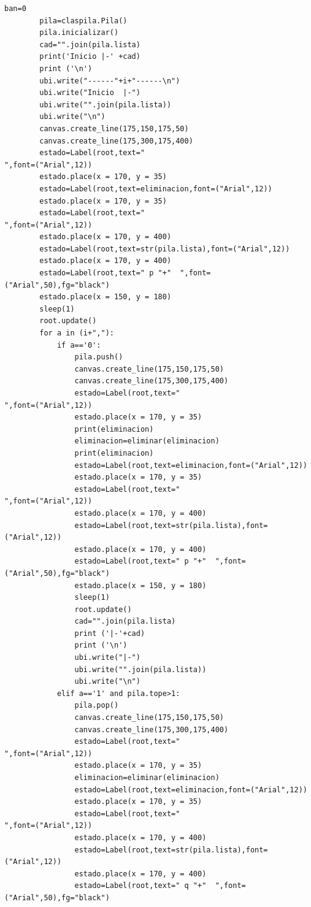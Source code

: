 \documentclass[12pt]{article}
\begin{document}
\begin{lstlisting}[frame=single]
		ban=0
		pila=claspila.Pila()
		pila.inicializar()
		cad="".join(pila.lista)
		print('Inicio |-' +cad) 
		print ('\n')
		ubi.write("------"+i+"------\n")
		ubi.write("Inicio  |-")
		ubi.write("".join(pila.lista))
		ubi.write("\n")
		canvas.create_line(175,150,175,50)
		canvas.create_line(175,300,175,400)
		estado=Label(root,text="                                                                      ",font=("Arial",12))
		estado.place(x = 170, y = 35)
		estado=Label(root,text=eliminacion,font=("Arial",12))
		estado.place(x = 170, y = 35)
		estado=Label(root,text="                                                                      ",font=("Arial",12))
		estado.place(x = 170, y = 400)
		estado=Label(root,text=str(pila.lista),font=("Arial",12))
		estado.place(x = 170, y = 400)
		estado=Label(root,text=" p "+"  ",font=("Arial",50),fg="black")
		estado.place(x = 150, y = 180)
		sleep(1)
		root.update()
		for a in (i+","):	
			if a=='0':
				pila.push()
				canvas.create_line(175,150,175,50)
				canvas.create_line(175,300,175,400)
				estado=Label(root,text="                                                                      ",font=("Arial",12))
				estado.place(x = 170, y = 35)
				print(eliminacion)
				eliminacion=eliminar(eliminacion)
				print(eliminacion)
				estado=Label(root,text=eliminacion,font=("Arial",12))
				estado.place(x = 170, y = 35)
				estado=Label(root,text="                                                                      ",font=("Arial",12))
				estado.place(x = 170, y = 400)
				estado=Label(root,text=str(pila.lista),font=("Arial",12))
				estado.place(x = 170, y = 400)
				estado=Label(root,text=" p "+"  ",font=("Arial",50),fg="black")
				estado.place(x = 150, y = 180)
				sleep(1)
				root.update()
				cad="".join(pila.lista)
				print ('|-'+cad)
				print ('\n')
				ubi.write("|-")
				ubi.write("".join(pila.lista))
				ubi.write("\n")
			elif a=='1' and pila.tope>1:
				pila.pop()
				canvas.create_line(175,150,175,50)
				canvas.create_line(175,300,175,400)
				estado=Label(root,text="                                                                      ",font=("Arial",12))
				estado.place(x = 170, y = 35)
				eliminacion=eliminar(eliminacion)
				estado=Label(root,text=eliminacion,font=("Arial",12))
				estado.place(x = 170, y = 35)
				estado=Label(root,text="                                                                      ",font=("Arial",12))
				estado.place(x = 170, y = 400)
				estado=Label(root,text=str(pila.lista),font=("Arial",12))
				estado.place(x = 170, y = 400)
				estado=Label(root,text=" q "+"  ",font=("Arial",50),fg="black")

\end{lstlisting}
\end{document}
